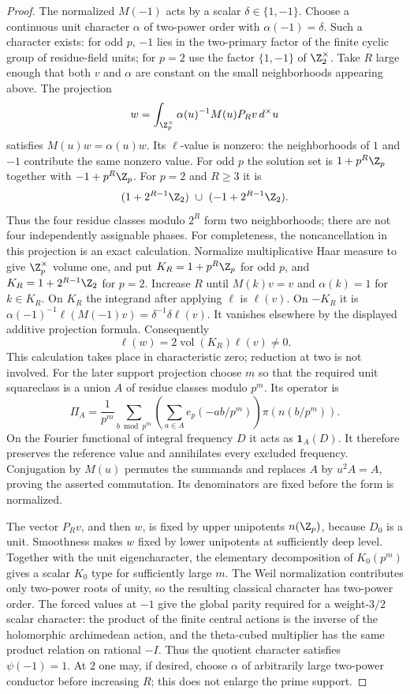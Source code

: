 \begin{proof}
The normalized $M(-1)$ acts by a scalar $\delta\in\{1,-1\}$.
Choose a continuous unit character $\alpha$ of two-power order
with $\alpha(-1)=\delta$. Such a character exists: for odd $p$,
$-1$ lies in the two-primary factor of the finite cyclic group
of residue-field units; for $p=2$ use the factor
$\{1,-1\}$ of $\Z_2^\times$.
Take $R$ large enough that both $v$ and $\alpha$ are constant on
the small neighborhoods appearing above. The projection
\[
 w=\int_{\Z_p^\times}\alpha(u)^{-1}M(u)P_Rv\,d^\times u
\]
satisfies $M(u)w=\alpha(u)w$. Its $\ell$-value is nonzero:
the neighborhoods of $1$ and $-1$ contribute the same nonzero
value. For odd $p$ the solution set is
$1+p^R\Z_p$ together with $-1+p^R\Z_p$.
For $p=2$ and $R\ge3$ it is
\[
 (1+2^{R-1}\Z_2)\ \cup\
 (-1+2^{R-1}\Z_2).
\]
Thus the four residue classes modulo $2^R$ form two neighborhoods;
there are not four independently assignable phases.
For completeness, the noncancellation in this projection is an exact
calculation. Normalize multiplicative Haar measure to give
$\Z_p^\times$ volume one, and put
$K_R=1+p^R\Z_p$ for odd $p$, and $K_R=1+2^{R-1}\Z_2$
for $p=2$. Increase $R$ until $M(k)v=v$ and $\alpha(k)=1$
for $k\in K_R$. On $K_R$ the integrand after applying $\ell$
is $\ell(v)$. On $-K_R$ it is
$\alpha(-1)^{-1}\ell(M(-1)v)=\delta^{-1}\delta\ell(v)$.
It vanishes elsewhere by the displayed additive projection formula.
Consequently
\[
                 \ell(w)=2\operatorname{vol}(K_R)\ell(v)\ne0.
\]
This calculation takes place in characteristic zero; reduction at two
is not involved. For the later support projection choose $m$ so that
the required unit squareclass is a union $A$ of residue classes modulo
$p^m$. Its operator is
\[
 \Pi_A=\frac1{p^m}\sum_{b\bmod p^m}
       \left(\sum_{a\in A}e_p(-ab/p^m)\right)\pi(n(b/p^m)).
\]
On the Fourier functional of integral frequency $D$ it acts as
$\mathbf1_A(D)$. It therefore preserves the reference value and
annihilates every excluded frequency. Conjugation by $M(u)$ permutes
the summands and replaces $A$ by $u^2A=A$, proving the asserted
commutation. Its denominators are fixed before the form is normalized.


The vector $P_Rv$, and then $w$, is fixed by upper unipotents
$n(\Z_p)$, because $D_0$ is a unit. Smoothness makes $w$
fixed by lower unipotents at sufficiently deep level. Together with
the unit eigencharacter, the elementary decomposition of
$K_0(p^m)$ gives a scalar $K_0$ type for sufficiently large $m$.
The Weil normalization contributes only two-power roots of unity,
so the resulting classical character has two-power order.
The forced values at $-1$ give the global parity required for a
weight-$3/2$ scalar character: the product of the finite central
actions is the inverse of the holomorphic archimedean action,
and the theta-cubed multiplier has the same product relation
on rational $-I$. Thus the quotient character satisfies
$\psi(-1)=1$. At $2$ one may, if desired, choose
$\alpha$ of arbitrarily large two-power conductor before increasing
$R$; this does not enlarge the prime support.


\end{proof}
